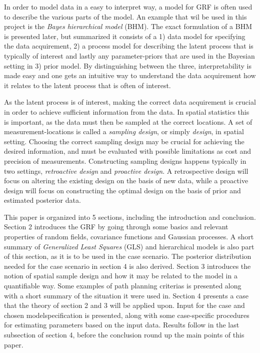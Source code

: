 In order to model data in a easy to interpret way, a model for GRF is often used to describe the various parts of the model. An example that wil be used in this project is the \textit{Bayes hierarchical model} (BHM). The exact formulation of a BHM is presented later, but summarized it consists of a 1) data model for specifying the data acquirement, 2) a process model for describing the latent process that is typically of interest and lastly any parameter-priors that are used in the Bayesian setting in 3) prior model. By distinguishing between the three, interpretability is made easy and one gets an intuitive way to understand the data acquirement how it relates to the latent process that is often of interest. 

As the latent process is of interest, making the correct data acquirement is crucial in order to achieve sufficient information from the data. In spatial statistics this is important, as the data must then be sampled at the correct locations. A set of measurement-locations is called a \textit{sampling design}, or simply \textit{design}, in spatial setting. Choosing the correct sampling design may be crucial for achieving the desired information, and must be evaluated with possible limitations as cost and precision of measurements. Constructing sampling designs happens typically in two settings, \textit{retroactive design} and \textit{proactive design}. A retrospective design will focus on altering the existing design on the basis of new data, while a proactive design will focus on constructing the optimal design on the basis of prior and estimated posterior data. 

This paper is organized into 5 sections, including the introduction and conclusion. Section 2 introduces the GRF by going through some basics and relevant properties of random fields, covariance functions and Gaussian processes. A short summary of \textit{Generalized Least Squares} (GLS) and hierarchical models is also part of this section, as it is to be used in the case scenario. The posterior distribution needed for the case scenario in section 4 is also derived. Section 3 introduces the notion of spatial sample design and how it may be related to the model in a quantifiable way. Some examples of path planning criterias is presented along with a short summary of the situation it were used in. Section 4 presents a case that the theory of section 2 and 3 will be applied upon. Input for the case and chosen modelspecification is presented, along with some case-specific procedures for estimating parameters based on the input data. Results follow in the last subsection of section 4, before the conclusion round up the main points of this paper.  

